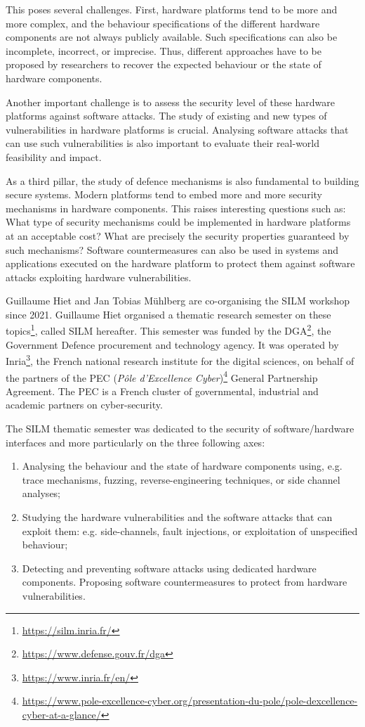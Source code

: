 \documentclass[a4paper,11pt]{article}
\begin{document}
This poses several challenges. First, hardware platforms tend to be more
and more complex, and the behaviour specifications of the different hardware
components are not always publicly available. Such specifications can also
be incomplete, incorrect, or imprecise. Thus, different approaches have to
be proposed by researchers to recover the expected behaviour or the state of
hardware components.

Another important challenge is to assess the security level of these
hardware platforms against software attacks. The study of existing and new
types of vulnerabilities in hardware platforms is crucial. Analysing
software attacks that can use such vulnerabilities is also important to
evaluate their real-world feasibility and impact.

As a third pillar, the study of defence mechanisms is also fundamental to
building secure systems. Modern platforms tend to embed more and more
security mechanisms in hardware components. This raises interesting
questions such as: What type of security mechanisms could be implemented in
hardware platforms at an acceptable cost? What are precisely the security
properties guaranteed by such mechanisms? Software countermeasures can also
be used in systems and applications executed on the hardware platform to
protect them against software attacks exploiting hardware vulnerabilities.

Guillaume Hiet and Jan Tobias M\"uhlberg are co-organising the SILM
workshop since 2021.
Guillaume Hiet organised a thematic
research semester on these topics\footnote{\url{https://silm.inria.fr/}},
called SILM hereafter. This semester was funded by the
DGA\footnote{\url{https://www.defense.gouv.fr/dga}}, the Government Defence
procurement and technology agency. It was  operated by
Inria\footnote{\url{https://www.inria.fr/en/}}, the French national
research institute for the digital sciences, on behalf of the partners of
the PEC (\textit{Pôle d'Excellence
Cyber})\footnote{\url{https://www.pole-excellence-cyber.org/presentation-du-pole/pole-dexcellence-cyber-at-a-glance/}}
General Partnership Agreement. The PEC is a French cluster of governmental,
industrial and academic partners on cyber-security.

The SILM thematic semester was dedicated to the security of
software/hardware interfaces and more particularly on the three
following axes:

\begin{enumerate}
%
    \item Analysing the behaviour and the state of hardware components
using, e.g. trace mechanisms, fuzzing, reverse-engineering techniques, or
side channel analyses;
%
    \item Studying the hardware vulnerabilities and the software attacks
that can exploit them: e.g. side-channels, fault injections, or
exploitation of unspecified behaviour;
%
    \item Detecting and preventing software attacks using dedicated
hardware components. Proposing software countermeasures to protect from
hardware vulnerabilities.
%
\end{enumerate}
\end{document}
